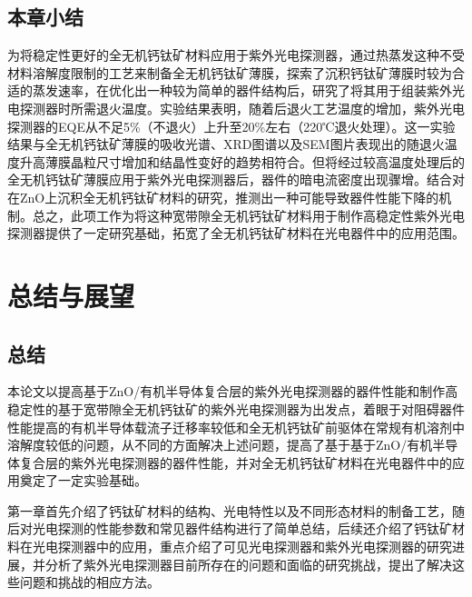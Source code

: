 \documentclass[forlib]{WHUMaster}   %
\begin{document}
{\section{本章小结}

为将稳定性更好的全无机钙钛矿材料应用于紫外光电探测器，通过热蒸发这种不受材料溶解度限制的工艺来制备全无机钙钛矿薄膜，探索了沉积钙钛矿薄膜时较为合适的蒸发速率，在优化出一种较为简单的器件结构后，研究了将其用于组装紫外光电探测器时所需退火温度。实验结果表明，随着后退火工艺温度的增加，紫外光电探测器的EQE从不足5\%（不退火）上升至20\%左右（220℃退火处理）。这一实验结果与全无机钙钛矿薄膜的吸收光谱、XRD图谱以及SEM图片表现出的随退火温度升高薄膜晶粒尺寸增加和结晶性变好的趋势相符合。但将经过较高温度处理后的全无机钙钛矿薄膜应用于紫外光电探测器后，器件的暗电流密度出现骤增。结合对在ZnO上沉积全无机钙钛矿材料的研究，推测出一种可能导致器件性能下降的机制。总之，此项工作为将这种宽带隙全无机钙钛矿材料用于制作高稳定性紫外光电探测器提供了一定研究基础，拓宽了全无机钙钛矿材料在光电器件中的应用范围。


\chapter{总结与展望 }

\section{总结}

本论文以提高基于ZnO/有机半导体复合层的紫外光电探测器的器件性能和制作高稳定性的基于宽带隙全无机钙钛矿的紫外光电探测器为出发点，着眼于对阻碍器件性能提高的有机半导体载流子迁移率较低和全无机钙钛矿前驱体在常规有机溶剂中溶解度较低的问题，从不同的方面解决上述问题，提高了基于基于ZnO/有机半导体复合层的紫外光电探测器的器件性能，并对全无机钙钛矿材料在光电器件中的应用奠定了一定实验基础。

第一章首先介绍了钙钛矿材料的结构、光电特性以及不同形态材料的制备工艺，随后对光电探测的性能参数和常见器件结构进行了简单总结，后续还介绍了钙钛矿材料在光电探测器中的应用，重点介绍了可见光电探测器和紫外光电探测器的研究进展，并分析了紫外光电探测器目前所存在的问题和面临的研究挑战，提出了解决这些问题和挑战的相应方法。

}
\end{document}
